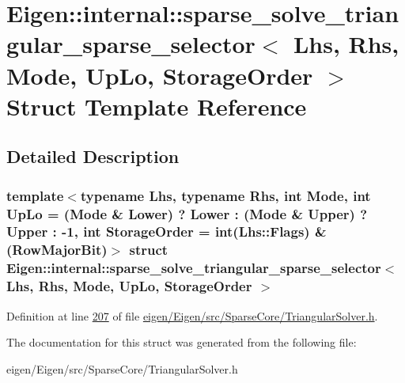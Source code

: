 \hypertarget{struct_eigen_1_1internal_1_1sparse__solve__triangular__sparse__selector}{}\section{Eigen\+:\+:internal\+:\+:sparse\+\_\+solve\+\_\+triangular\+\_\+sparse\+\_\+selector$<$ Lhs, Rhs, Mode, Up\+Lo, Storage\+Order $>$ Struct Template Reference}
\label{struct_eigen_1_1internal_1_1sparse__solve__triangular__sparse__selector}


\subsection{Detailed Description}
\subsubsection*{template$<$typename Lhs, typename Rhs, int Mode, int Up\+Lo = (\+Mode \& Lower) ? Lower \+: (\+Mode \& Upper) ? Upper \+: -\/1, int Storage\+Order = int(\+Lhs\+::\+Flags) \& (\+Row\+Major\+Bit)$>$\newline
struct Eigen\+::internal\+::sparse\+\_\+solve\+\_\+triangular\+\_\+sparse\+\_\+selector$<$ Lhs, Rhs, Mode, Up\+Lo, Storage\+Order $>$}



Definition at line \hyperlink{eigen_2_eigen_2src_2_sparse_core_2_triangular_solver_8h_source_l00207}{207} of file \hyperlink{eigen_2_eigen_2src_2_sparse_core_2_triangular_solver_8h_source}{eigen/\+Eigen/src/\+Sparse\+Core/\+Triangular\+Solver.\+h}.



The documentation for this struct was generated from the following file\+:\begin{DoxyCompactItemize}
\item 
eigen/\+Eigen/src/\+Sparse\+Core/\+Triangular\+Solver.\+h\end{DoxyCompactItemize}
